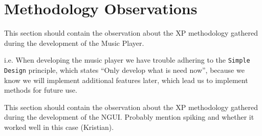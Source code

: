 \section{Methodology Observations}\label{sec:nguiMethodology}
This section should contain the observation about the XP methodology gathered during the development of the Music Player.

i.e. When developing the music player we have trouble adhering to the \texttt{Simple Design} principle, which states ``Only develop what is need now'', because we know we will implement additional features later, which lead us to implement methods for future use.

This section should contain the observation about the XP methodology gathered during the development of the NGUI. Probably mention spiking and whether it worked well in this case (Kristian).